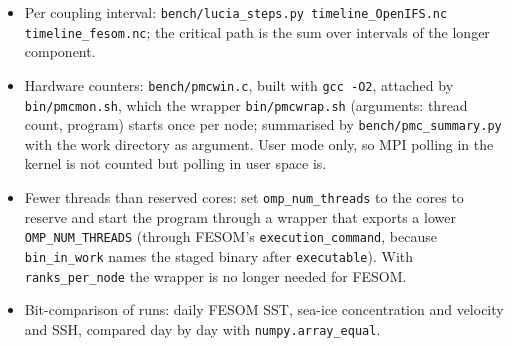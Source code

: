 \documentclass[11pt,a4paper]{article}
\begin{document}
\begin{itemize}
\item Per coupling interval: \texttt{bench/lucia\_steps.py timeline\_OpenIFS.nc timeline\_fesom.nc}; the critical path is the sum over intervals of the longer component.
\item Hardware counters: \texttt{bench/pmcwin.c}, built with \texttt{gcc -O2}, attached by \texttt{bin/pmcmon.sh}, which the wrapper \texttt{bin/pmcwrap.sh} (arguments: thread count, program) starts once per node; summarised by \texttt{bench/pmc\_summary.py} with the work directory as argument. User mode only, so MPI polling in the kernel is not counted but polling in user space is.
\item Fewer threads than reserved cores: set \texttt{omp\_num\_threads} to the cores to reserve and start the program through a wrapper that exports a lower \texttt{OMP\_NUM\_THREADS} (through FESOM's \texttt{execution\_command}, because \texttt{bin\_in\_work} names the staged binary after \texttt{executable}). With \texttt{ranks\_per\_node} the wrapper is no longer needed for FESOM.
\item Bit-comparison of runs: daily FESOM SST, sea-ice concentration and velocity and SSH, compared day by day with \texttt{numpy.array\_equal}.
\end{itemize}
\end{document}
